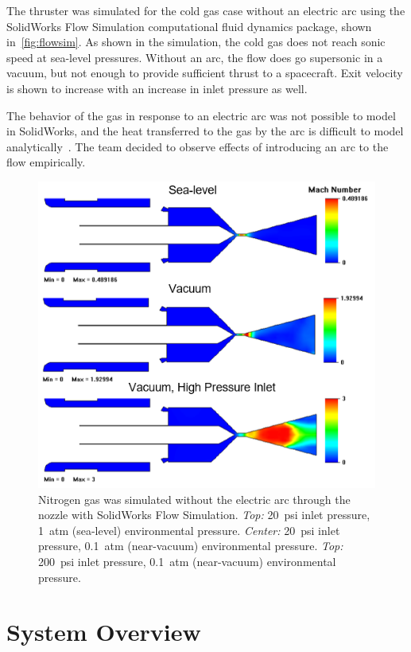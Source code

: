 \documentclass[journal]{IEEEtran}
\begin{document}
The thruster was simulated for the cold gas case without an electric arc using the SolidWorks Flow Simulation computational fluid dynamics package, shown in~\autoref{fig:flowsim}.
As shown in the simulation, the cold gas does not reach sonic speed at sea-level pressures.
Without an arc, the flow does go supersonic in a vacuum, but not enough to provide sufficient thrust to a spacecraft.
Exit velocity is shown to increase with an increase in inlet pressure as well.

The behavior of the gas in response to an electric arc was not possible to model in SolidWorks, and the heat transferred to the gas by the arc is difficult to model analytically~\cite{mitarcjets}.
The team decided to observe effects of introducing an arc to the flow empirically.

\begin{figure}
  \includegraphics[width=\linewidth]{figs/flowsim}
  \caption{Nitrogen gas was simulated without the electric arc through the nozzle with SolidWorks Flow Simulation.
  \emph{Top: }\SI{20}{psi} inlet pressure, \SI{1}{atm} (sea-level) environmental pressure.
  \emph{Center: }\SI{20}{psi} inlet pressure, \SI{0.1}{atm} (near-vacuum) environmental pressure.
  \emph{Top: }\SI{200}{psi} inlet pressure, \SI{0.1}{atm} (near-vacuum) environmental pressure.}
\label{fig:flowsim}
\end{figure}

\section{System Overview}
\end{document}
